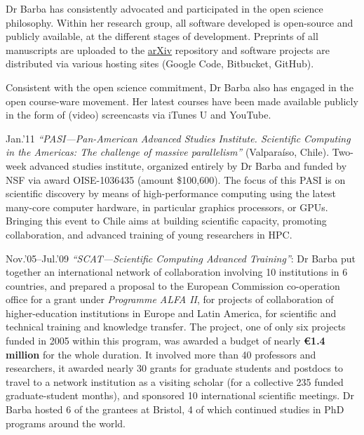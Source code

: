 \documentclass{proposalnsf}
\newcommand{\gpu}{\textsc{GPU}}
\newlength{\up}
\begin{document}
\begin{list}{ }{\setlength{\leftmargin}{2.5em}}


	\item[]  Dr Barba has consistently advocated and participated in the open science philosophy.  Within her research group, all software developed is open-source and publicly available, at the different stages of development.  Preprints of all manuscripts are uploaded to the \href{http://arxiv.org/find/cs/1/au:+Barba_L/0/1/0/all/0/1}{arXiv} repository and software projects are distributed via various hosting sites (Google Code, Bitbucket, GitHub).

	Consistent with the open science commitment, Dr Barba also has engaged in the open course-ware movement.  Her latest courses have been made available publicly in the form of (video) screencasts via iTunes U and YouTube.
	
	\item[Jan.'11] \emph{``PASI---Pan-American Advanced Studies Institute.  Scientific Computing in the Americas: The challenge of massive parallelism''} (Valpara\'iso, Chile).  Two-week advanced studies institute, organized entirely by Dr Barba and funded by NSF via award OISE-1036435 (amount \$100,600).  The focus of this PASI is on scientific discovery by means of high-performance computing using the latest many-core computer hardware, in particular graphics processors, or \gpu s.  Bringing this event to Chile aims at building scientific capacity, promoting collaboration, and advanced training of young researchers in HPC. 
	
	\item[Nov.'05--Jul.'09] \emph{``SCAT---Scientific Computing Advanced Training''}: Dr Barba put together an international network of collaboration involving 10 institutions in 6 countries, and prepared a proposal to the European Commission co-operation office for a grant under \emph{Programme ALFA II}, for projects of collaboration of higher-education institutions in Europe and Latin America, for scientific and technical training and knowledge transfer.   The project, one of only six projects funded in 2005 within this program, was awarded a budget of nearly \textbf{\euro 1.4 million} for the whole duration. 
It involved more than 40 professors and researchers, it awarded nearly 30 grants for graduate students and postdocs to travel to a network institution as a visiting scholar (for a collective 235 funded graduate-student months), and sponsored 10 international scientific meetings. Dr Barba hosted 6 of the grantees at Bristol, 4 of which continued studies in PhD programs around the world. 


\end{list}
\end{document}
